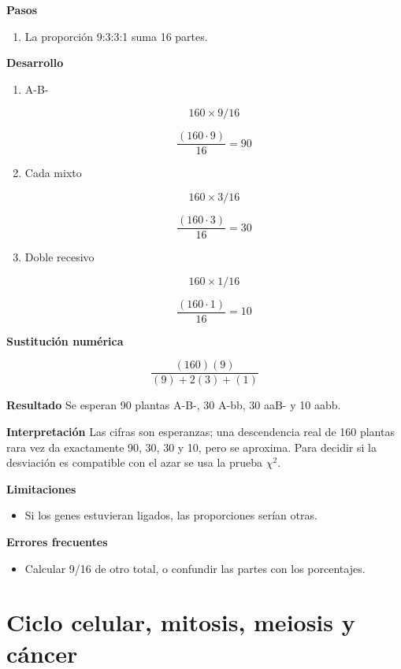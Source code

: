\documentclass{book}
\begin{document}
\noindent\textbf{Pasos}
\begin{enumerate}
\item
La proporción 9:3:3:1 suma 16 partes.

\end{enumerate}

\noindent\textbf{Desarrollo}
\begin{enumerate}
\item
A-B-


\[
160 \times 9/16
\]

\[
\frac{\left(160\cdot 9\right)}{16} = 90
\]
\item
Cada mixto


\[
160 \times 3/16
\]

\[
\frac{\left(160\cdot 3\right)}{16} = 30
\]
\item
Doble recesivo


\[
160 \times 1/16
\]

\[
\frac{\left(160\cdot 1\right)}{16} = 10
\]
\end{enumerate}

\noindent\textbf{Sustitución numérica}

\[
\frac{\left(160\right) \left(9\right)}{\left(9\right) + 2 \left(3\right) + \left(1\right)}
\]

\noindent\textbf{Resultado}
Se esperan 90 plantas A-B-, 30 A-bb, 30 aaB- y 10 aabb.


\noindent\textbf{Interpretación}
Las cifras son esperanzas; una descendencia real de 160 plantas rara vez da exactamente 90, 30, 30 y 10, pero se aproxima. Para decidir si la desviación es compatible con el azar se usa la prueba \(\chi^{2}\).


\noindent\textbf{Limitaciones}
\begin{itemize}
\item Si los genes estuvieran ligados, las proporciones serían otras.
\end{itemize}

\noindent\textbf{Errores frecuentes}
\begin{itemize}
\item Calcular 9/16 de otro total, o confundir las partes con los porcentajes.
\end{itemize}

\section{Ciclo celular, mitosis, meiosis y cáncer}
\end{document}
